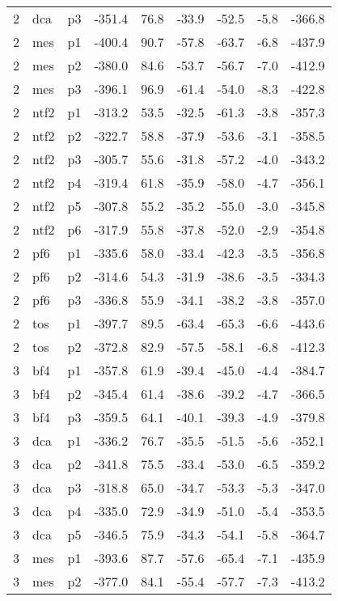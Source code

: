 \documentclass[a4paper]{article}
\begin{document}
\begin{table}[ht]
\begin{tabular}{rllrrrrrr}
   2 & dca & p3 & -351.4 & 76.8 & -33.9 & -52.5 & -5.8 & -366.8 \\ 
   2 & mes & p1 & -400.4 & 90.7 & -57.8 & -63.7 & -6.8 & -437.9 \\ 
   2 & mes & p2 & -380.0 & 84.6 & -53.7 & -56.7 & -7.0 & -412.9 \\ 
   2 & mes & p3 & -396.1 & 96.9 & -61.4 & -54.0 & -8.3 & -422.8 \\ 
   2 & ntf2 & p1 & -313.2 & 53.5 & -32.5 & -61.3 & -3.8 & -357.3 \\ 
   2 & ntf2 & p2 & -322.7 & 58.8 & -37.9 & -53.6 & -3.1 & -358.5 \\ 
   2 & ntf2 & p3 & -305.7 & 55.6 & -31.8 & -57.2 & -4.0 & -343.2 \\ 
   2 & ntf2 & p4 & -319.4 & 61.8 & -35.9 & -58.0 & -4.7 & -356.1 \\ 
   2 & ntf2 & p5 & -307.8 & 55.2 & -35.2 & -55.0 & -3.0 & -345.8 \\ 
   2 & ntf2 & p6 & -317.9 & 55.8 & -37.8 & -52.0 & -2.9 & -354.8 \\ 
   2 & pf6 & p1 & -335.6 & 58.0 & -33.4 & -42.3 & -3.5 & -356.8 \\ 
   2 & pf6 & p2 & -314.6 & 54.3 & -31.9 & -38.6 & -3.5 & -334.3 \\ 
   2 & pf6 & p3 & -336.8 & 55.9 & -34.1 & -38.2 & -3.8 & -357.0 \\ 
   2 & tos & p1 & -397.7 & 89.5 & -63.4 & -65.3 & -6.6 & -443.6 \\ 
   2 & tos & p2 & -372.8 & 82.9 & -57.5 & -58.1 & -6.8 & -412.3 \\ 
   3 & bf4 & p1 & -357.8 & 61.9 & -39.4 & -45.0 & -4.4 & -384.7 \\ 
   3 & bf4 & p2 & -345.4 & 61.4 & -38.6 & -39.2 & -4.7 & -366.5 \\ 
   3 & bf4 & p3 & -359.5 & 64.1 & -40.1 & -39.3 & -4.9 & -379.8 \\ 
   3 & dca & p1 & -336.2 & 76.7 & -35.5 & -51.5 & -5.6 & -352.1 \\ 
   3 & dca & p2 & -341.8 & 75.5 & -33.4 & -53.0 & -6.5 & -359.2 \\ 
   3 & dca & p3 & -318.8 & 65.0 & -34.7 & -53.3 & -5.3 & -347.0 \\ 
   3 & dca & p4 & -335.0 & 72.9 & -34.9 & -51.0 & -5.4 & -353.5 \\ 
   3 & dca & p5 & -346.5 & 75.9 & -34.3 & -54.1 & -5.8 & -364.7 \\ 
   3 & mes & p1 & -393.6 & 87.7 & -57.6 & -65.4 & -7.1 & -435.9 \\ 
   3 & mes & p2 & -377.0 & 84.1 & -55.4 & -57.7 & -7.3 & -413.2 \\ 

\end{tabular}
\end{table}
\end{document}
